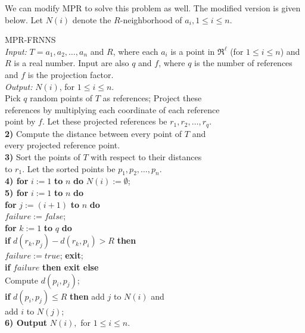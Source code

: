 \documentclass{article}
\theoremstyle{definition}
\theoremstyle{remark}
\begin{document}
We can modify {\sf MPR} to solve this problem as well. The modified version is given below. Let $N(i)$ denote the $R$-neighborhood of $a_i,1\leq i\leq n$.

 {\sf MPR-FRNNS}\\
{\em Input:} $T=a_1,a_2,\ldots,a_n$ and $R$, where each $a_i$ is a point in $\Re^\ell$ (for $1\leq i\leq n$) and $R$ is a real number. Input are also $q$ and $f$, where $q$ is the number of references and $f$ is the projection factor.\\
{\em Output:} $N(i)$, for $1\leq i\leq n$.\\

\vspace{-0.15in}
 Pick $q$ random points of $T$ as references; Project these \\
references by multiplying each coordinate of each reference\\
point by $f$. Let these projected references be $r_1,r_2,\ldots,r_q$.\\
 {\bf 2)} Compute the distance between every point of $T$ and \\
 every projected reference point.\\
{\bf 3)} Sort the points of $T$ with respect to their distances\\
 to $r_1$. Let the sorted points be
$p_1,p_2,\ldots,p_n$.\\
{\bf 4) for} $i:=1$ {\bf to} $n$ {\bf do} $N(i):=\emptyset$;\\
{\bf 5) for} $i:=1$ {\bf to} $n$ {\bf do}\\
\hspace*{0.4in} {\bf for} $j:=(i+1)$ {\bf to} $n$ {\bf do}\\
\hspace*{0.7in} $failure:=false$;\\
\hspace*{0.7in} {\bf for} $k:=1$ {\bf to} $q$ {\bf do}\\
\hspace*{0.9in} {\bf if} $d(r_k,p_j)-d(r_k,p_i)>R$ {\bf then}\\
\hspace*{1.1in} $failure:=true$; {\bf exit};\\
\hspace*{0.7in} {\bf if} $failure$ {\bf then exit else}\\
\hspace*{0.9in} Compute $d(p_i,p_j)$; \\
\hspace*{0.9in} {\bf if} $d(p_i,p_j)\leq R$ {\bf then} add $j$ to $N(i)$ and \\
\hspace*{0.9in} add $i$ to $N(j)$;\\
{\bf 6) Output} $N(i),$ for $1\leq i\leq n$.
\end{document}
